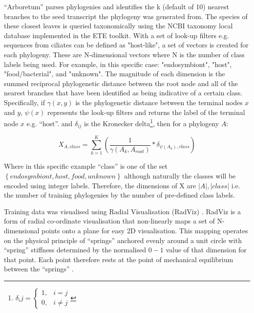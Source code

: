 ``Arboretum'' parses phylogenies and identifies the k (default of 10) nearest branches to the seed transcript
the phylogeny was generated from.  The species of these closest leaves is queried taxonomically using the
NCBI taxonomy local database implemented in the ETE toolkit.  With a set of look-up filters e.g.
sequences from ciliates can be defined as "host-like", a set of vectors is created for each phylogeny.  
These are N-dimensional vectors where N is the number of class labels being used. 
For example, in this specific case: "endosymbiont", "host", "food/bacterial", and "unknown".
The magnitude of each dimension is the summed reciprocal phylogenetic distance between the root node and all
of the nearest branches that have been identified as being indicative of a certain class.
Specifically, if \(\gamma(x,y)\) is the phylogenetic distance between the terminal nodes \(x\) and \(y\), \(\psi(x)\) 
represents the look-up filters and returns the label of the terminal node \(x\) e.g. ``host''.
and \(\delta_{ij}\) is the Kronecker delta\footnote{
	\(\delta_ij = \begin{cases}
	1, &  i = j\\
	0, & i \neq j 
	\end{cases} \)}, then for a phylogeny \(A\):
\begin{center}
	\[
X_{A, class} = \sum_{k=1}^K \left( \frac{1}{\gamma(A_k, A_{root})} * \delta_{\psi(A_k),class} \right)
	\]
\end{center}
Where in this specific example ``class'' is one of the set \(\left\{endosymbiont, host, food, unknown\right\}\)
although naturally the classes will be encoded using integer labels.
Therefore, the dimensions of X are \(|A|,|class|\) i.e. the number of training phylogenies by the
number of pre-defined class labels.

Training data was visualised using Radial Visualisation (RadViz) \citep{Hoffman1997,Fayyad2001}.
RadViz is a form of radial co-ordinate visualisation that non-linearly maps a set of N-dimensional 
points onto a plane for easy 2D visualisation. This mapping operates on the physical principle
of ``springs'' anchored evenly around a unit circle with ``spring'' stiffness determined by 
the normalised \(0-1\) value of that dimension for that point.  Each point therefore rests
at the point of mechanical equilibrium between the ``springs'' \citep{NovakovaLenkaandStepankova2006}.

